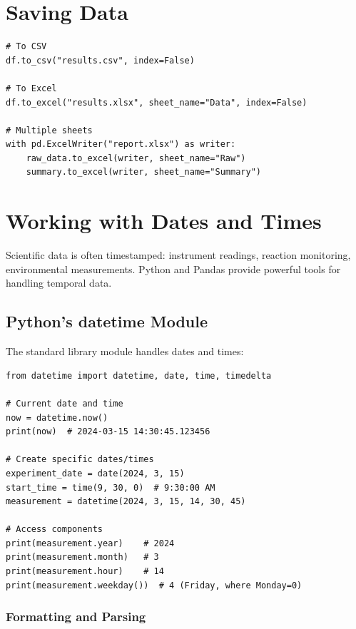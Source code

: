 \section{Saving Data}
\label{sec:saving}

\begin{lstlisting}
# To CSV
df.to_csv("results.csv", index=False)

# To Excel
df.to_excel("results.xlsx", sheet_name="Data", index=False)

# Multiple sheets
with pd.ExcelWriter("report.xlsx") as writer:
    raw_data.to_excel(writer, sheet_name="Raw")
    summary.to_excel(writer, sheet_name="Summary")
\end{lstlisting}

\section{Working with Dates and Times}
\label{sec:datetime}

Scientific data is often timestamped: instrument readings, reaction monitoring, environmental measurements. Python and Pandas provide powerful tools for handling temporal data.

\subsection{Python's datetime Module}

The standard library  module handles dates and times:

\begin{lstlisting}
from datetime import datetime, date, time, timedelta

# Current date and time
now = datetime.now()
print(now)  # 2024-03-15 14:30:45.123456

# Create specific dates/times
experiment_date = date(2024, 3, 15)
start_time = time(9, 30, 0)  # 9:30:00 AM
measurement = datetime(2024, 3, 15, 14, 30, 45)

# Access components
print(measurement.year)    # 2024
print(measurement.month)   # 3
print(measurement.hour)    # 14
print(measurement.weekday())  # 4 (Friday, where Monday=0)
\end{lstlisting}

\subsubsection{Formatting and Parsing}

